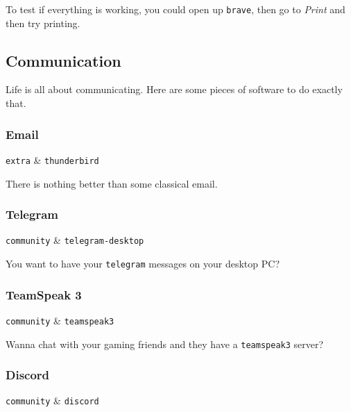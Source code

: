 \documentclass[10pt]{dustdoc}
\begin{document}
To test if everything is working, you could open up \texttt{brave}, then go to \emph{Print} and then try printing.

\subsection{Communication}%
\label{sec:gui-communication}

Life is all about communicating.
Here are some pieces of software to do exactly that.

\subsubsection{Email}%
\label{sec:email}

\begin{pkgtable}
    \texttt{extra} & \texttt{thunderbird} \\
\end{pkgtable}

There is nothing better than some classical email.

\subsubsection{Telegram}%
\label{sec:telegram}

\begin{pkgtable}
    \texttt{community} & \texttt{telegram-desktop} \\
\end{pkgtable}

You want to have your \texttt{telegram} messages on your desktop PC?\@

\subsubsection{TeamSpeak 3}%
\label{sec:teamspeak-3}

\begin{pkgtable}
    \texttt{community} & \texttt{teamspeak3} \\
\end{pkgtable}

Wanna chat with your gaming friends and they have a \texttt{teamspeak3} server?

\subsubsection{Discord}%
\label{sec:discord}

\begin{pkgtable}
    \texttt{community} & \texttt{discord} \\
\end{pkgtable}
\end{document}
